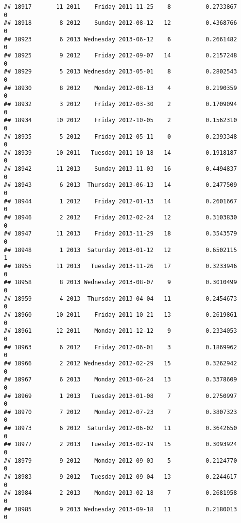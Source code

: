 \documentclass[
]{article}
\begin{document}
\begin{verbatim}
## 18917       11 2011    Friday 2011-11-25    8          0.2733867             0
## 18918        8 2012    Sunday 2012-08-12   12          0.4368766             0
## 18923        6 2013 Wednesday 2013-06-12    6          0.2661482             0
## 18925        9 2012    Friday 2012-09-07   14          0.2157248             0
## 18929        5 2013 Wednesday 2013-05-01    8          0.2802543             0
## 18930        8 2012    Monday 2012-08-13    4          0.2190359             0
## 18932        3 2012    Friday 2012-03-30    2          0.1709094             0
## 18934       10 2012    Friday 2012-10-05    2          0.1562310             0
## 18935        5 2012    Friday 2012-05-11    0          0.2393348             0
## 18939       10 2011   Tuesday 2011-10-18   14          0.1918187             0
## 18942       11 2013    Sunday 2013-11-03   16          0.4494837             0
## 18943        6 2013  Thursday 2013-06-13   14          0.2477509             0
## 18944        1 2012    Friday 2012-01-13   14          0.2601667             0
## 18946        2 2012    Friday 2012-02-24   12          0.3103830             0
## 18947       11 2013    Friday 2013-11-29   18          0.3543579             0
## 18948        1 2013  Saturday 2013-01-12   12          0.6502115             1
## 18955       11 2013   Tuesday 2013-11-26   17          0.3233946             0
## 18958        8 2013 Wednesday 2013-08-07    9          0.3010499             0
## 18959        4 2013  Thursday 2013-04-04   11          0.2454673             0
## 18960       10 2011    Friday 2011-10-21   13          0.2619861             0
## 18961       12 2011    Monday 2011-12-12    9          0.2334053             0
## 18963        6 2012    Friday 2012-06-01    3          0.1869962             0
## 18966        2 2012 Wednesday 2012-02-29   15          0.3262942             0
## 18967        6 2013    Monday 2013-06-24   13          0.3378609             0
## 18969        1 2013   Tuesday 2013-01-08    7          0.2750997             0
## 18970        7 2012    Monday 2012-07-23    7          0.3807323             0
## 18973        6 2012  Saturday 2012-06-02   11          0.3642650             0
## 18977        2 2013   Tuesday 2013-02-19   15          0.3093924             0
## 18979        9 2012    Monday 2012-09-03    5          0.2124770             0
## 18983        9 2012   Tuesday 2012-09-04   13          0.2244617             0
## 18984        2 2013    Monday 2013-02-18    7          0.2681958             0
## 18985        9 2013 Wednesday 2013-09-18   11          0.2180013             0

\end{verbatim}
\end{document}
